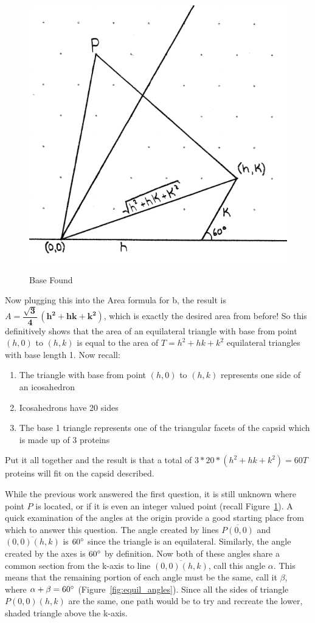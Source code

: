 \documentclass[12pt,letter]{article}
\begin{document}
\begin{figure}[h]
	\centering
	\caption{Base Found}
	\includegraphics[width=.45\textwidth]{ddagger3.pdf}
	\label{fig:equil_baselength}
\end{figure}

Now plugging this into the Area formula for b, the result is $A = \mathbf{ \dfrac{\sqrt{3}} {4} \, (h^2 + hk + k^2) }$, which is exactly the desired area from before! So this definitively shows that the area of an equilateral triangle with base from point $(h,0)$ to $(h,k)$ is equal to the area of $T = h^2 + hk + k^2$ equilateral triangles with base length 1. Now recall:

\begin{enumerate}
	\item The triangle with base from point $(h,0)$ to $(h,k)$ represents one side of an icosahedron
	\item Icosahedrons have 20 sides
	\item The base 1 triangle represents one of the triangular facets of the capsid which is made up of 3 proteins
\end{enumerate}

Put it all together and the result is that a total of $3*20*(h^2 + hk + k^2) = 60 T$ proteins will fit on the capsid described.

While the previous work answered the first question, it is still unknown where point $P$ is located, or if it is even an integer valued point (recall Figure~\ref{fig:equil_baselength}). A quick examination of the angles at the origin provide a good starting place from which to answer this question. The angle created by lines $\overline{P(0,0)}$ and $\overline{(0,0)(h,k)}$ is $60\degree$ since the triangle is an equilateral. Similarly, the angle created by the axes is $60\degree$ by definition. Now both of these angles share a common section from the k-axis to line $\overline{(0,0)(h,k)}$, call this angle $\alpha$. This means that the remaining portion of each angle must be the same, call it $\beta$, where $\alpha + \beta = 60\degree$ (Figure~\ref{fig:equil_angles}). Since all the sides of triangle $P(0,0)(h,k)$ are the same, one path would be to try and recreate the lower, shaded triangle above the k-axis.
\end{document}
